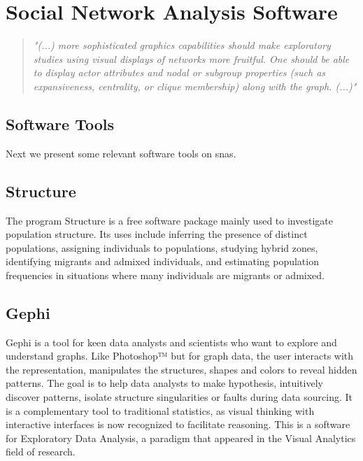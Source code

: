 \section{Social Network Analysis Software}
\label{sec:snas}

\begin{quote}
\textit{"(...) more sophisticated graphics capabilities should make exploratory studies using visual displays of networks more fruitful. One should be able to display actor attributes and nodal or subgroup properties (such as expansiveness, centrality, or clique membership) along with the graph. (...)"} \citep{wasserman1994social}
\end{quote}

\subsection{Software Tools}
Next we present some relevant software tools on \glspl{sna}.

\subsection{Structure}

\indent \indent The program Structure \citep{structure-software} is a free software package mainly used to investigate population structure. Its uses include inferring the presence of distinct populations, assigning individuals to populations, studying hybrid zones, identifying migrants and admixed individuals, and estimating population frequencies in situations where many individuals are migrants or admixed.

\subsection{Gephi}

\indent \indent Gephi \citep{bastian2009gephi} is a tool for keen data analysts and scientists who want to explore and understand graphs. Like Photoshop™ but for graph data, the user interacts with the representation, manipulates the structures, shapes and colors to reveal hidden patterns. The goal is to help data analysts to make hypothesis, intuitively discover patterns, isolate structure singularities or faults during data sourcing. It is a complementary tool to traditional statistics, as visual thinking with interactive interfaces is now recognized to facilitate reasoning. This is a software for Exploratory Data Analysis, a paradigm that appeared in the Visual Analytics field of research.

